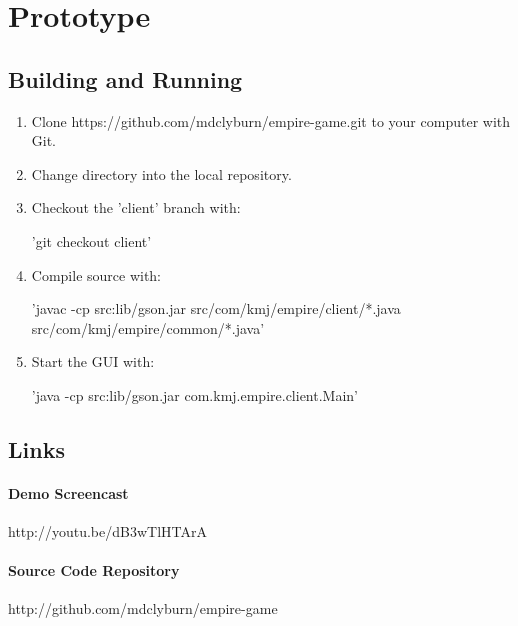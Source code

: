 \chapter{Prototype}

\section{Building and Running}
\begin{enumerate}
	\item Clone https://github.com/mdclyburn/empire-game.git to your computer with Git.
	\item Change directory into the local repository.
	\item Checkout the 'client' branch with:\\
	\begin{center}
	'git checkout client'
	\end{center}
	\item Compile source with:\\
	\begin{center}
	'javac -cp src:lib/gson.jar src/com/kmj/empire/client/*.java src/com/kmj/empire/common/*.java'
	\end{center}
	\item Start the GUI with:\\
	\begin{center}
	'java -cp src:lib/gson.jar com.kmj.empire.client.Main'
	\end{center}
\end{enumerate}

\section{Links}
\subsubsection{Demo Screencast}
\begin{center}
http://youtu.be/dB3wTlHTArA
\end{center}

\subsubsection{Source Code Repository}
\begin{center}
http://github.com/mdclyburn/empire-game
\end{center}
